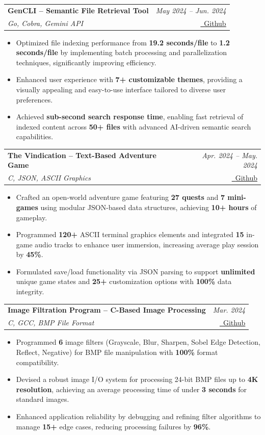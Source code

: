 \documentclass[letterpaper,10pt]{article}
\makeatletter
\newcommand{\resumeItem}[1]{
  \item\small{
    {#1 \vspace{-1mm}}
  }
}
\newcommand{\resumeProject}[4]{
  \item
    \begin{tabular*}{0.97\textwidth}[t]{l@{\extracolsep{\fill}}r}
      \textbf{\small #1} & \textit{\small #3} \\
      \textit{\small #2} & \small #4 \\
    \end{tabular*}\vspace{-7pt}
}
\newcommand{\resumeItemListStart}{\begin{itemize}}
\newcommand{\resumeItemListEnd}{\end{itemize}\vspace{-5pt}}
\makeatother
\begin{document}
      \resumeProject
        {GenCLI -- Semantic File Retrieval Tool}
        {Go, Cobra, Gemini API}
        {May 2024 -- Jun. 2024}
        {\href{https://github.com/lakshyajain-0291/gencli}{\faGithub \ \underline{Github}}}
        \resumeItemListStart
          \resumeItem{Optimized file indexing performance from \textbf{19.2 seconds/file} to \textbf{1.2 seconds/file} by implementing batch processing and parallelization techniques, significantly improving efficiency.}
          \resumeItem{Enhanced user experience with \textbf{7+ customizable themes}, providing a visually appealing and easy-to-use interface tailored to diverse user preferences.}
          \resumeItem{Achieved \textbf{sub-second search response time}, enabling fast retrieval of indexed content across \textbf{50+ files} with advanced AI-driven semantic search capabilities.}
        \resumeItemListEnd

      \resumeProject
        {The Vindication -- Text-Based Adventure Game}
        {C, JSON, ASCII Graphics}
        {Apr. 2024 -- May. 2024}
        {\href{https://github.com/lakshyajain-0291/Text-based-Adventure-Game-in-C}{\faGithub \ \underline{Github}}}
        \resumeItemListStart
          \resumeItem{Crafted an open-world adventure game featuring \textbf{27 quests} and \textbf{7 mini-games} using modular JSON-based data structures, achieving \textbf{10+ hours} of gameplay.}
          \resumeItem{Programmed \textbf{120+} ASCII terminal graphics elements and integrated \textbf{15} in-game audio tracks to enhance user immersion, increasing average play session by \textbf{45\%}.}
          \resumeItem{Formulated save/load functionality via JSON parsing to support \textbf{unlimited} unique game states and \textbf{25+} customization options with \textbf{100\%} data integrity.}
        \resumeItemListEnd

      \resumeProject
        {Image Filtration Program -- C-Based Image Processing}
        {C, GCC, BMP File Format}
        {Mar. 2024}
        {\href{https://github.com/lakshyajain-0291/Image-filtration-in-C}{\faGithub \ \underline{Github}}}
        \resumeItemListStart
          \resumeItem{Programmed \textbf{6} image filters (Grayscale, Blur, Sharpen, Sobel Edge Detection, Reflect, Negative) for BMP file manipulation with \textbf{100\%} format compatibility.}
          \resumeItem{Devised a robust image I/O system for processing 24-bit BMP files up to \textbf{4K resolution}, achieving an average processing time of under \textbf{3 seconds} for standard images.}
          \resumeItem{Enhanced application reliability by debugging and refining filter algorithms to manage \textbf{15+} edge cases, reducing processing failures by \textbf{96\%}.}
        \resumeItemListEnd
\end{document}
